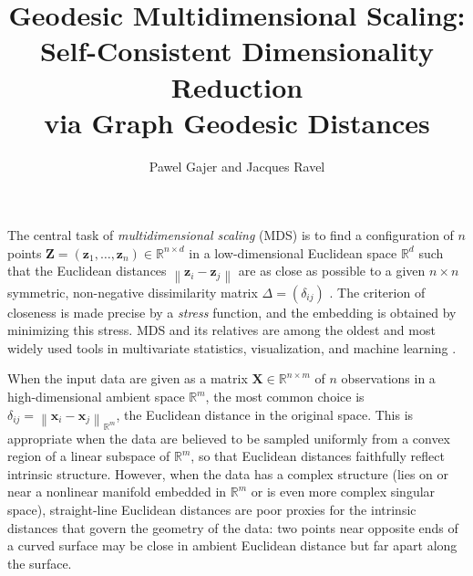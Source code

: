 \documentclass[11pt]{article}
\theoremstyle{definition}
\newcommand{\R}{\mathbb{R}}
\newcommand{\bx}{\mathbf{x}}
\newcommand{\bX}{\mathbf{X}}
\newcommand{\bz}{\mathbf{z}}
\newcommand{\bZ}{\mathbf{Z}}
\newcommand{\norm}[1]{\left\|#1\right\|}
\begin{document}
\title{Geodesic Multidimensional Scaling:\\
       Self-Consistent Dimensionality Reduction\\ via Graph Geodesic Distances}

\author{Pawel Gajer and Jacques Ravel}

\maketitle


The central task of \emph{multidimensional scaling} (MDS) is to find a
configuration of $n$ points $\bZ = (\bz_1, \ldots, \bz_n) \in \R^{n \times
  d}$ in a low-dimensional Euclidean space $\R^d$ such that the Euclidean
distances $\norm{\bz_i - \bz_j}$ are as close as possible to a given $n
\times n$ symmetric, non-negative dissimilarity matrix $\Delta = (\delta_{ij})$
\citep{torgerson1952multidimensional, kruskal1964multidimensional,
  borg2005modern, cox2000multidimensional}.  The criterion of closeness is made
precise by a \emph{stress} function, and the embedding is obtained by
minimizing this stress.  MDS and its relatives are among the oldest and most
widely used tools in multivariate statistics, visualization, and machine
learning \citep{shepard1962analysis, sammon1969nonlinear,
  vandermaaten2008tsne, mcinnes2018umap}.

When the input data are given as a matrix $\bX \in \R^{n \times m}$ of $n$
observations in a high-dimensional ambient space $\R^m$, the most common choice
is $\delta_{ij} = \norm{\bx_i - \bx_j}_{\R^m}$, the Euclidean distance in the
original space. This is appropriate when the data are believed to be sampled
uniformly from a convex region of a linear subspace of $\R^m$, so that Euclidean
distances faithfully reflect intrinsic structure. However, when the data has a
complex structure (lies on or near a nonlinear manifold embedded in $\R^m$ or is
even more complex singular space), straight-line Euclidean distances are poor
proxies for the intrinsic distances that govern the geometry of the data: two
points near opposite ends of a curved surface may be close in ambient Euclidean
distance but far apart along the surface.
\end{document}
